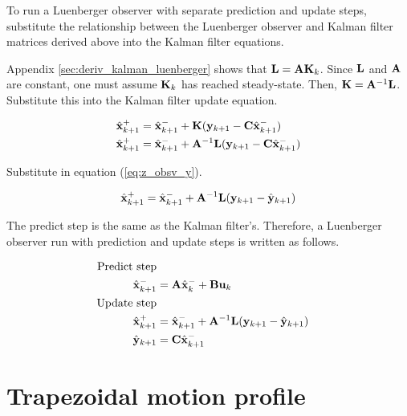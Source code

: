 To run a Luenberger \gls{observer} with separate prediction and update steps,
substitute the relationship between the Luenberger \gls{observer} and Kalman
filter matrices derived above into the Kalman filter equations.

Appendix \ref{sec:deriv_kalman_luenberger} shows that
$\mathbf{L} = \mathbf{A}\mathbf{K}_k$. Since $\mathbf{L}$ and $\mathbf{A}$ are constant, one
must assume $\mathbf{K}_k$ has reached steady-state. Then,
$\mathbf{K} = \mathbf{A}^{-1}\mathbf{L}$. Substitute this into the Kalman filter update
equation.

\begin{align*}
  \hat{\mathbf{x}}_{k+1}^+ &= \hat{\mathbf{x}}_{k+1}^- + \mathbf{K}(\mathbf{y}_{k+1} -
    \mathbf{C}\hat{\mathbf{x}}_{k+1}^-) \\
  \hat{\mathbf{x}}_{k+1}^+ &= \hat{\mathbf{x}}_{k+1}^- + \mathbf{A}^{-1}\mathbf{L}
    (\mathbf{y}_{k+1} - \mathbf{C}\hat{\mathbf{x}}_{k+1}^-)
\end{align*}

Substitute in equation (\ref{eq:z_obsv_y}).

\begin{equation*}
  \hat{\mathbf{x}}_{k+1}^+ = \hat{\mathbf{x}}_{k+1}^- + \mathbf{A}^{-1}\mathbf{L}
    (\mathbf{y}_{k+1} - \hat{\mathbf{y}}_{k+1})
\end{equation*}

The predict step is the same as the Kalman filter's. Therefore, a Luenberger
\gls{observer} run with prediction and update steps is written as follows.

\begin{align}
  \text{Predict step} \nonumber \\
  \hat{\mathbf{x}}_{k+1}^- &= \mathbf{A}\hat{\mathbf{x}}_k^- + \mathbf{B}\mathbf{u}_k \\
  \text{Update step} \nonumber \\
  \hat{\mathbf{x}}_{k+1}^+ &= \hat{\mathbf{x}}_{k+1}^- + \mathbf{A}^{-1}\mathbf{L}
    (\mathbf{y}_{k+1} - \hat{\mathbf{y}}_{k+1}) \\
  \hat{\mathbf{y}}_{k+1} &= \mathbf{C} \hat{\mathbf{x}}_{k+1}^-
\end{align}

\section{Trapezoidal motion profile}
\label{sec:deriv_trapezoid_profile}

